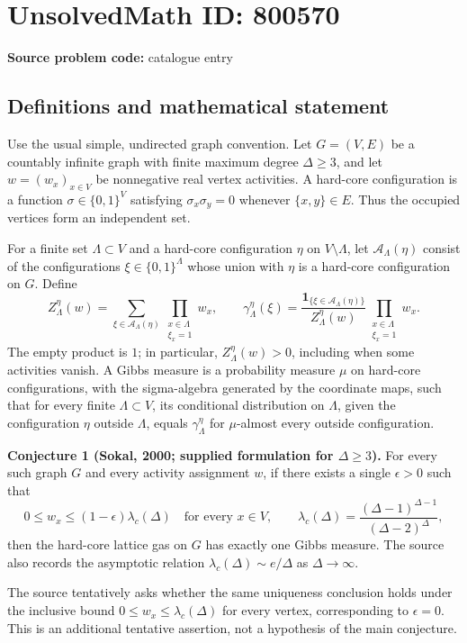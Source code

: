 \documentclass[11pt]{article}
\begin{document}
\section*{UnsolvedMath ID: 800570}
\textbf{Source problem code:} catalogue entry
\subsection{Definitions and mathematical statement}
Use the usual simple, undirected graph convention. Let \(G=(V,E)\) be a countably infinite graph with finite maximum degree \(\Delta\ge 3\), and let \(w=(w_x)_{x\in V}\) be nonnegative real vertex activities. A hard-core configuration is a function \(\sigma\in\{0,1\}^{V}\) satisfying \(\sigma_x\sigma_y=0\) whenever \(\{x,y\}\in E\). Thus the occupied vertices form an independent set.

For a finite set \(\Lambda\subset V\) and a hard-core configuration \(\eta\) on \(V\setminus\Lambda\), let \(\mathcal A_\Lambda(\eta)\) consist of the configurations \(\xi\in\{0,1\}^{\Lambda}\) whose union with \(\eta\) is a hard-core configuration on \(G\). Define
\[
 Z_\Lambda^\eta(w)=\sum_{\xi\in\mathcal A_\Lambda(\eta)}\prod_{\substack{x\in\Lambda\\\xi_x=1}}w_x,
 \qquad
 \gamma_\Lambda^\eta(\xi)=\frac{\mathbf 1_{\{\xi\in\mathcal A_\Lambda(\eta)\}}}{Z_\Lambda^\eta(w)}\prod_{\substack{x\in\Lambda\\\xi_x=1}}w_x.
\]
The empty product is \(1\); in particular, \(Z_\Lambda^\eta(w)>0\), including when some activities vanish. A Gibbs measure is a probability measure \(\mu\) on hard-core configurations, with the sigma-algebra generated by the coordinate maps, such that for every finite \(\Lambda\subset V\), its conditional distribution on \(\Lambda\), given the configuration \(\eta\) outside \(\Lambda\), equals \(\gamma_\Lambda^\eta\) for \(\mu\)-almost every outside configuration.

\textbf{Conjecture 1 (Sokal, 2000; supplied formulation for \(\Delta\ge3\)).} For every such graph \(G\) and every activity assignment \(w\), if there exists a single \(\epsilon>0\) such that
\[
 0\le w_x\le (1-\epsilon)\lambda_c(\Delta)
 \quad\text{for every }x\in V,
 \qquad
 \lambda_c(\Delta)=\frac{(\Delta-1)^{\Delta-1}}{(\Delta-2)^\Delta},
\]
then the hard-core lattice gas on \(G\) has exactly one Gibbs measure. The source also records the asymptotic relation \(\lambda_c(\Delta)\sim e/\Delta\) as \(\Delta\to\infty\).

The source tentatively asks whether the same uniqueness conclusion holds under the inclusive bound \(0\le w_x\le\lambda_c(\Delta)\) for every vertex, corresponding to \(\epsilon=0\). This is an additional tentative assertion, not a hypothesis of the main conjecture.
\end{document}
